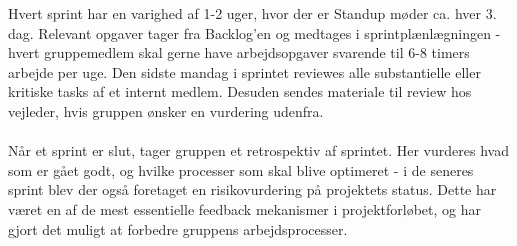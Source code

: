 \documentclass[Rapport/Rapport_main.tex]{subfiles}
\begin{document}
Hvert sprint har en varighed af 1-2 uger, hvor der er Standup møder ca. hver 3. dag. Relevant opgaver tager fra Backlog'en og medtages i sprintplænlægningen - hvert gruppemedlem skal gerne have arbejdsopgaver svarende til 6-8 timers arbejde per uge. Den sidste mandag i sprintet reviewes alle substantielle eller kritiske tasks af et internt medlem. Desuden sendes materiale til review hos vejleder, hvis gruppen ønsker en vurdering udenfra. \\\\
Når et sprint er slut, tager gruppen et retrospektiv af sprintet. Her vurderes hvad som er gået godt, og hvilke processer som skal blive optimeret - i de seneres sprint blev der også foretaget en risikovurdering på projektets status.
Dette har været en af de mest essentielle feedback mekanismer i projektforløbet, og har gjort det muligt at forbedre gruppens arbejdsprocesser.
\end{document}

